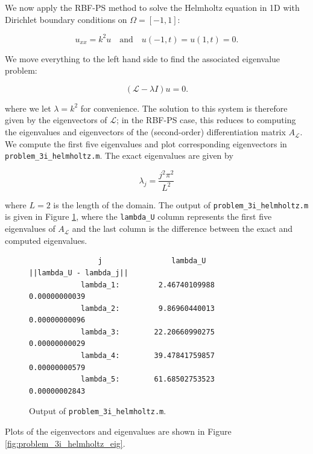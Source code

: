 \begin{solution}
    \pagebreak
    We now apply the RBF-PS method to solve the Helmholtz equation in 1D with Dirichlet boundary conditions on 
    $\Omega = [-1, 1]$:

    $$
    u_{xx} = k^2 u \quad \text{and} \quad u(-1, t) = u(1, t) = 0. 
    $$

    We move everything to the left hand side to find the associated eigenvalue problem:

    $$
    \left( \mathcal{L} - \lambda I \right) u = 0.
    $$

    where we let $\lambda = k^2$ for convenience. The solution to this system is therefore given by the eigenvectors of 
    $\mathcal{L}$; in the RBF-PS case, this reduces to computing the eigenvalues and eigenvectors of the (second-order) 
    differentiation matrix $A_{\mathcal{L}}$. We compute the first five eigenvalues and plot corresponding eigenvectors 
    in \texttt{problem\_3i\_helmholtz.m}. The exact eigenvalues are given by 
    
    $$
    \lambda_j = \frac{j^2 \pi^2}{L^2}
    $$
    
    where $L = 2$ is the length of the domain. The output of \texttt{problem\_3i\_helmholtz.m} is given in Figure 
    \ref{fig:problem_3i_helmholtz_output}, where the \texttt{lambda\_U} column represents the first five eigenvalues of 
    $A_{\mathcal{L}}$ and the last column is the difference between the exact and computed eigenvalues.

    \begin{figure}[h]
        \begin{verbatim}
                j                lambda_U         ||lambda_U - lambda_j||
            lambda_1:         2.46740109988           0.00000000039 
            lambda_2:         9.86960440013           0.00000000096 
            lambda_3:        22.20660990275           0.00000000029 
            lambda_4:        39.47841759857           0.00000000579 
            lambda_5:        61.68502753523           0.00000002843
        \end{verbatim}
        \caption{Output of \texttt{problem\_3i\_helmholtz.m}.}
        \label{fig:problem_3i_helmholtz_output}
    \end{figure}

    \pagebreak
    Plots of the eigenvectors and eigenvalues are shown in Figure \ref{fig:problem_3i_helmholtz_eig}.


\end{solution}
